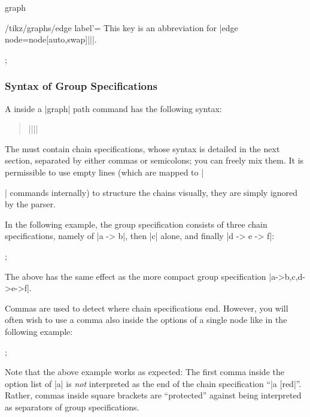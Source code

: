 \begin{pathoperation}{graph}{}
    \begin{key}{/tikz/graphs/edge label'=}
        This key is an abbreviation for |edge node=node[auto,swap]{||}|.
\begin{codeexample}[preamble={\usetikzlibrary{graphs.standard}}]
\tikz {};
\end{codeexample}
    \end{key}
\end{pathoperation}


\subsubsection{Syntax of Group Specifications}
\label{section-library-graphs-group-spec}

A  inside a |graph| path command has the following
syntax:
%
\begin{quote}
    |{||}|
\end{quote}
%
The  must contain chain specifications, whose syntax
is detailed in the next section, separated by either commas or semicolons; you
can freely mix them. It is permissible to use empty lines (which are mapped to
|\par| commands internally) to structure the chains visually, they are simply
ignored by the parser.

In the following example, the group specification consists of three chain
specifications, namely of |a -> b|, then |c| alone, and finally |d -> e -> f|:
%
\begin{codeexample}[preamble={\usetikzlibrary{graphs}}]
\tikz {};
\end{codeexample}
%
The above has the same effect as the more compact group specification
|{a->b,c,d->e->f}|.

Commas are used to detect where chain specifications end. However, you will
often wish to use a comma also inside the options of a single node like in the
following example:
%
\begin{codeexample}[preamble={\usetikzlibrary{graphs}}]
\tikz {};
\end{codeexample}

Note that the above example works as expected: The first comma inside the
option list of |a| is \emph{not} interpreted as the end of the chain
specification ``|a [red|''. Rather, commas inside square brackets are
``protected'' against being interpreted as separators of group specifications.


